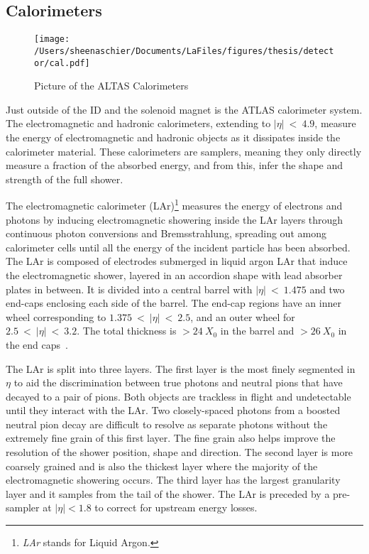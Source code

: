 \subsection{Calorimeters}
  \begin{figure}[tbp]
  \centering
 \texttt{[image: /Users/sheenaschier/Documents/LaFiles/figures/thesis/detector/cal.pdf]}
    \caption{Picture of the ALTAS Calorimeters}
   \label{fig:cal}
 \end{figure}
 Just outside of the ID and the solenoid magnet is the ATLAS calorimeter system.  The electromagnetic and hadronic calorimeters, extending to $|\eta|~<~4.9$, measure the energy of electromagnetic and hadronic objects as it dissipates inside the calorimeter material.  These calorimeters are samplers, meaning they only directly measure a fraction of the absorbed energy, and from this, infer the shape and strength of the full shower.


The electromagnetic calorimeter (LAr)\footnote{\textit{LAr} stands for Liquid Argon.} measures the energy of electrons and photons by inducing electromagnetic showering inside the LAr layers through continuous photon conversions and Bremsstrahlung, spreading out among calorimeter cells until all the energy of the incident particle has been absorbed.  The LAr is composed of electrodes submerged in liquid argon LAr that induce the electromagnetic shower, layered in an accordion shape with lead absorber plates in between. It is divided into a central barrel with $|\eta|~<~1.475$ and two end-caps enclosing each side of the barrel.  The end-cap regions have an inner wheel corresponding to $1.375~<~|\eta|~<~2.5$, and an outer wheel for $2.5~<~|\eta|~<~3.2$.  The total thickness is $> 24~X_0$ in the barrel and $>26~X_0 $ in the end caps~\cite{wilkens:J160}.  

The LAr is split into three layers.  The first layer is the most finely segmented in $\eta$ to aid the discrimination between true photons and neutral pions that have decayed to a pair of pions.  Both objects are trackless in flight and undetectable until they interact with the LAr.  Two closely-spaced photons from a boosted neutral pion decay are difficult to resolve as separate photons without the extremely fine grain of this first layer.  The fine grain also helps improve the resolution of the shower position, shape and direction.  The second layer is more coarsely grained and is also the thickest layer where the majority of the electromagnetic showering occurs.  The third layer has the largest granularity layer and it samples from the tail of the shower.  The LAr is preceded by a pre-sampler at $|\eta| < 1.8$ to correct for upstream energy losses. 


